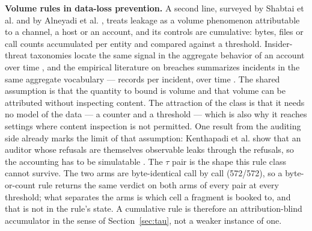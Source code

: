 \documentclass[preprint,12pt]{elsarticle}
\begin{document}
\textbf{Volume rules in data-loss prevention.} A second line, surveyed by Shabtai et al. and by
Alneyadi et al. \cite{shabtai2012survey,alneyadi2016survey}, treats leakage as a volume phenomenon
attributable to a channel, a host or an account, and its controls are cumulative: bytes, files or
call counts accumulated per entity and compared against a threshold. Insider-threat taxonomies
locate the same signal in the aggregate behavior of an account over time \cite{homoliak2019insight},
and the empirical literature on breaches summarizes incidents in the same aggregate vocabulary ---
records per incident, over time \cite{edwards2016hype}. The shared assumption is that the quantity
to bound is volume and that volume can be attributed without inspecting content. The attraction of
the class is that it needs no model of the data --- a counter and a threshold --- which is also why
it reaches settings where content inspection is not permitted. One result from the auditing side
already marks the limit of that assumption: Kenthapadi et al. show that an auditor whose refusals
are themselves observable leaks through the refusals, so the accounting has to be simulatable
\cite{kenthapadi2005simulatable}. The $\tau$ pair is the shape this rule class cannot survive. The
two arms are byte-identical call by call (572/572), so a byte-or-count rule returns the same
verdict on both arms of every pair at every threshold; what separates the arms is which cell a
fragment is booked to, and that is not in the rule's state. A cumulative rule is therefore an
attribution-blind accumulator in the sense of Section~\ref{sec:tau}, not a weaker instance of one.
\end{document}
